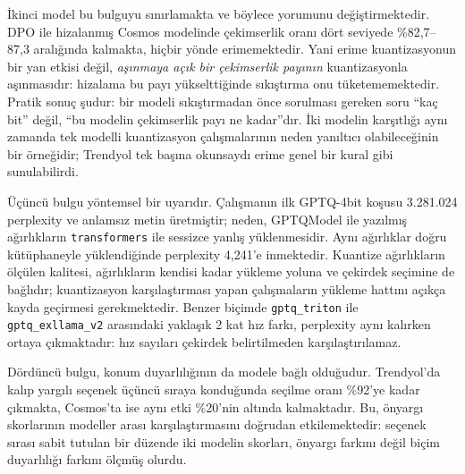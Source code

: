 \documentclass[conference]{IEEEtran}
\begin{document}
İkinci model bu bulguyu sınırlamakta ve böylece yorumunu değiştirmektedir.
DPO ile hizalanmış Cosmos modelinde çekimserlik oranı dört seviyede
\%82,7--87,3 aralığında kalmakta, hiçbir yönde erimemektedir. Yani erime
kuantizasyonun bir yan etkisi değil, \emph{aşınmaya açık bir çekimserlik
payının} kuantizasyonla aşınmasıdır: hizalama bu payı yükselttiğinde
sıkıştırma onu tüketememektedir. Pratik sonuç şudur: bir modeli
sıkıştırmadan önce sorulması gereken soru ``kaç bit'' değil, ``bu modelin
çekimserlik payı ne kadar''dır. İki modelin karşıtlığı aynı zamanda tek
modelli kuantizasyon çalışmalarının neden yanıltıcı olabileceğinin bir
örneğidir; Trendyol tek başına okunsaydı erime genel bir kural gibi
sunulabilirdi.

Üçüncü bulgu yöntemsel bir uyarıdır. Çalışmanın ilk GPTQ-4bit koşusu
3.281.024 perplexity ve anlamsız metin üretmiştir; neden, GPTQModel ile
yazılmış ağırlıkların \texttt{transformers} ile sessizce yanlış yüklenmesidir.
Aynı ağırlıklar doğru kütüphaneyle yüklendiğinde perplexity 4,241'e
inmektedir. Kuantize ağırlıkların ölçülen kalitesi, ağırlıkların kendisi kadar
yükleme yoluna ve çekirdek seçimine de bağlıdır; kuantizasyon karşılaştırması
yapan çalışmaların yükleme hattını açıkça kayda geçirmesi gerekmektedir.
Benzer biçimde \texttt{gptq\_triton} ile \texttt{gptq\_exllama\_v2} arasındaki
yaklaşık 2 kat hız farkı, perplexity aynı kalırken ortaya çıkmaktadır: hız
sayıları çekirdek belirtilmeden karşılaştırılamaz.

Dördüncü bulgu, konum duyarlılığının da modele bağlı olduğudur. Trendyol'da
kalıp yargılı seçenek üçüncü sıraya konduğunda seçilme oranı \%92'ye kadar
çıkmakta, Cosmos'ta ise aynı etki \%20'nin altında kalmaktadır. Bu, önyargı
skorlarının modeller arası karşılaştırmasını doğrudan etkilemektedir: seçenek
sırası sabit tutulan bir düzende iki modelin skorları, önyargı farkını değil
biçim duyarlılığı farkını ölçmüş olurdu.
\end{document}
